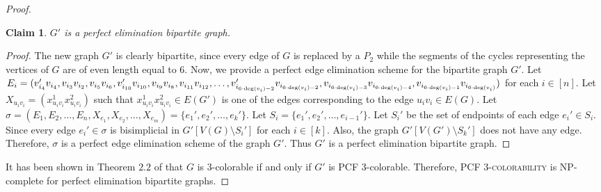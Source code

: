 \documentclass[11pt]{article}
\theoremstyle{plain}
\newtheorem{claim}{Claim}
\begin{document}
\begin{proof}
		\begin{claim} \label{reduction3}
			$G'$ is a perfect elimination bipartite graph.
		\end{claim}
		\begin{proof}
			The new graph $G'$ is clearly bipartite, since every edge of $G$ is replaced by a $P_2$ while the segments of the cycles representing the vertices of $G$ are of even length equal to $6$. 
			Now, we provide a perfect edge elimination scheme for the bipartite graph $G'$. Let $E_i = (v_{i_4}'v_{i_4}, v_{i_3}v_{i_2}, v_{i_5}v_{i_6}, v_{i_{10}}'v_{i_{10}}, v_{i_9}v_{i_8}, v_{i_{11}}\\v_{i_{12}}, \ldots, v_{i_{6\cdot\deg(v_i)-2}}'v_{i_{6\cdot\deg(v_i)-2}}, v_{i_{6\cdot\deg(v_i)-3}}v_{i_{6\cdot\deg(v_i)-4}}, v_{i_{6\cdot\deg(v_i)-1}}v_{i_{6\cdot\deg(v_i)}})$ for each $i\in[n]$. 
			Let $X_{u_iv_i} = (x^{1}_{u_iv_i}x^{2}_{u_iv_i} )$ such that $x^{1}_{u_iv_i}x^{2}_{u_iv_i}\in E(G')$ is one of the edges corresponding to the edge $u_iv_i\in E(G)$. 
			Let $\sigma = (E_1, E_2, \ldots, E_n, X_{e_1}, X_{e_2}, \ldots, X_{e_m}) = \{e_1', e_2', \ldots, e_k'\}$. Let $S_i=\{e_1', e_2', \ldots, e_{i-1}'\}$. Let $S_i'$ be the set of endpoints of each edge $e_i'\in S_i$.
			Since every edge $e_i'\in\sigma$ is bisimplicial in $G'[V(G)\setminus S_i']$ for each $i \in [k]$. Also, the graph $G'[V(G') \setminus S_k']$ does not have any edge. Therefore, $\sigma$ is a perfect edge elimination scheme of the graph $G'$. Thus $G'$ is a perfect elimination bipartite graph.
		\end{proof}
		
		It has been shown in Theorem $2.2$ of \cite{XXWH} that 
		$G$ is $3$-colorable if and only if $G'$ is PCF $3$-colorable. Therefore, PCF $3$-\textsc{colorability} is NP-complete for perfect elimination bipartite graphs. 
	\end{proof}
	
\end{document}
